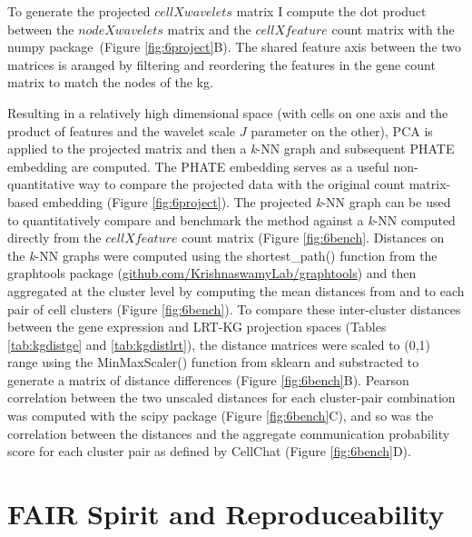 To generate the projected \(cell X wavelets\) matrix I compute the dot product between the \(node X wavelets\) matrix and the \(cell X feature\) count matrix with the numpy package~\cite{harris_array_2020}(Figure \ref{fig:6project}B). The shared feature axis between the two matrices is aranged by filtering and reordering the features in the gene count matrix to match the nodes of the \acrshort{kg}.

Resulting in a relatively high dimensional space (with cells on one axis and the product of features and the wavelet scale \(J\) parameter on the other), PCA is applied to the projected matrix and then a \emph{k}-NN graph and subsequent PHATE embedding are computed. The PHATE embedding serves as a useful non-quantitative way to compare the projected data with the original count matrix-based embedding (Figure \ref{fig:6project}).
The projected \emph{k}-NN graph can be used to quantitatively compare and benchmark the method against a \emph{k}-NN computed directly from the \(cell X feature\) count matrix (Figure \ref{fig:6bench}. Distances on the \emph{k}-NN graphs were computed using the shortest\_path() function from the graphtools package (\url{github.com/KrishnaswamyLab/graphtools}) and then aggregated at the cluster level by computing the mean distances from and to each pair of cell clusters (Figure \ref{fig:6bench}). To compare these inter-cluster distances between the gene expression and LRT-KG projection spaces (Tables \ref{tab:kgdistge} and \ref{tab:kgdistlrt}), the distance matrices were scaled to (0,1) range using the MinMaxScaler() function from sklearn and substracted to generate a matrix of distance differences (Figure \ref{fig:6bench}B). Pearson correlation between the two unscaled distances for each cluster-pair combination was computed with the scipy package (Figure \ref{fig:6bench}C), and so was the correlation between the distances and the aggregate communication probability score for each cluster pair as defined by CellChat (Figure \ref{fig:6bench}D). 




\section{FAIR Spirit and Reproduceability}


